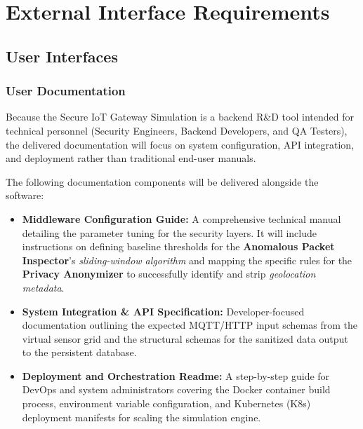 \documentclass[12pt,letterpaper]{article}
\begin{document}
\section{External Interface Requirements}
\subsection{User Interfaces}
\subsubsection{User Documentation}
Because the Secure IoT Gateway Simulation is a backend R\&D tool intended for technical personnel (Security Engineers, Backend Developers, and QA Testers), the delivered documentation will focus on system configuration, API integration, and deployment rather than traditional end-user manuals.\par
The following documentation components will be delivered alongside the software:\par
\begin{itemize}
\item \textbf{Middleware Configuration Guide:} A comprehensive technical manual detailing the parameter tuning for the security layers. It will include instructions on defining baseline thresholds for the \textbf{Anomalous Packet Inspector}'s \emph{sliding-window algorithm} and mapping the specific rules for the \textbf{Privacy Anonymizer} to successfully identify and strip \emph{geolocation metadata}.
\item \textbf{System Integration \& API Specification:} Developer-focused documentation outlining the expected MQTT/HTTP input schemas from the virtual sensor grid and the structural schemas for the sanitized data output to the persistent database.
\item \textbf{Deployment and Orchestration Readme:} A step-by-step guide for DevOps and system administrators covering the Docker container build process, environment variable configuration, and Kubernetes (K8s) deployment manifests for scaling the simulation engine.
\end{itemize}
\end{document}
